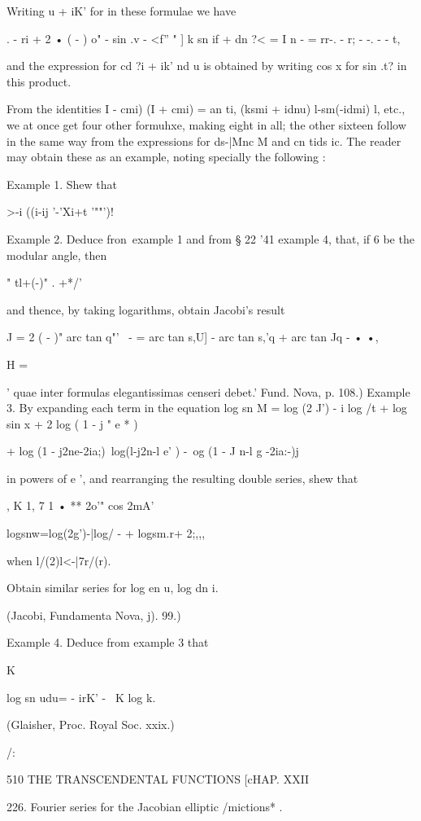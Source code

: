 Writing u + iK' for in these formulae we have

. - ri + 2 • ( - ) o" - sin .v - <f'' " ] k sn if + dn ?< = I n - =
rr-. - r; - -. - - t,

and the expression for cd ?i + ik' nd u is obtained by writing cos x
for sin .t? in this product.

From the identities I - cmi) (I + cmi) = an ti, (ksmi + idnu)
l-sm(-idmi) l, etc., we at once get four other formuhxe, making eight
in all; the other sixteen follow in the same way from the expressions
for ds-|Mnc M and cn tids ic. The reader may obtain these as an
example, noting specially the following :

Example 1. Shew that

  >-i ((i-ij '-'Xi+t '""')!

Example 2. Deduce fron\ example 1 and from § 22 '41 example 4, that,
if 6 be the modular angle, then

" tl+(-)" . +*/'

and thence, by taking logarithms, obtain Jacobi's result

J = 2 ( - )" arc tan q"'~ - = arc tan s,U] - arc tan s,'q + arc tan Jq
- • •,

H =

' quae inter formulas elegantissimas censeri debet.' Fund. Nova, p.
108.) Example 3. By expanding each term in the equation log sn M = log
(2 J') - i log /t + log sin x + 2 log ( 1 - j " e * )

+ log (1 - j2ne-2ia;)\ log(l-j2n-l e' ) -\ og (1 - J n-l g -2ia:-)j

in powers of e ', and rearranging the resulting double series, shew
that

, K 1, 7 1 • ** 2o'" cos 2mA'

logsnw=log(2g')-|log/ - + logsm.r+ 2;,,,

when l/(2)l<-|7r/(r).

Obtain similar series for log en u, log dn i.

(Jacobi, Fundamenta Nova, j). 99.)

Example 4. Deduce from example 3 that

 K

log sn udu= - irK' - \ K log k.

(Glaisher, Proc. Royal Soc. xxix.)

/:

510 THE TRANSCENDENTAL FUNCTIONS [cHAP. XXII

226. Fourier series for the Jacobian elliptic /mictions* .

